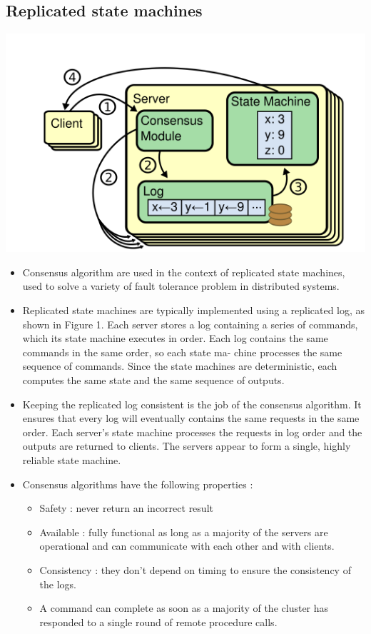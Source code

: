 
\subsection{Replicated state machines}

\begin{center}
\includegraphics[scale=0.5]{img/repli_log}
\end{center}
\begin{itemize}
\item Consensus algorithm are used in the context of replicated state machines, used to solve a variety of fault tolerance problem in distributed systems.

\item Replicated state machines are typically implemented using a replicated log, as shown in Figure 1. Each server stores a log containing a series of commands, which its state machine executes in order. Each log contains the same commands in the same order, so each state ma- chine processes the same sequence of commands. Since the state machines are deterministic, each computes the same state and the same sequence of outputs.

\item Keeping the replicated log consistent is the job of the consensus algorithm. It ensures that every log will eventually contains the same requests in the same order. Each server's state machine processes the requests in log order and the outputs are returned to clients. The servers appear to form a single, highly reliable state machine. 

\item Consensus algorithms have the following properties :
\begin{itemize}
\item Safety : never return an incorrect result
\item Available : fully functional as long as a majority of the servers are operational and can communicate with each other and with clients.
\item Consistency : they don't depend on timing to ensure the consistency of the logs.
\item A command can complete as soon as a majority of the cluster has responded to a single round of remote procedure calls.
\end{itemize}

\end{itemize}

